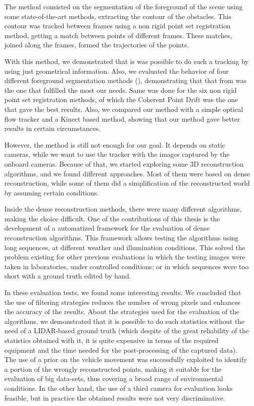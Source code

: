 The method consisted on the segmentation of the foreground of the scene using some state-of-the-art methods, extracting the contour of the obstacles. This contour was tracked between frames using a non rigid point set registration method, getting a match between points of different frames. These matches, joined along the frames, formed the trajectories of the points.

With this method, we demonstrated that is was possible to do such a tracking by using just geometrical information. Also, we evaluated the behavior of four different foreground segmentation methods (\cite{lopez2011stochastic, lopez2011foreground, guo2011hierarchical, reddy2012improved}), demonstrating that that from \cite{reddy2012improved} was the one that fulfilled the most our needs. Same was done for the six non rigid point set registration methods, of which the Coherent Point Drift was the one that gave the best results. Also, we compared our method with a simple optical flow tracker and a Kinect based method, showing that our method gave better results in certain circumstances.

However, the method is still not enough for our goal. It depends on static cameras, while we want to use the tracker with the images captured by the onboard cameras. Because of that, we started exploring some 3D reconstruction algorithms, and we found different approaches. Most of them were based on dense reconstruction, while some of them did a simplification of the reconstructed world by assuming certain conditions.

Inside the dense reconstruction methods, there were many different algorithms, making the choice difficult. One of the contributions of this thesis is the development of a automatized framework for the evaluation of dense reconstruction algorithms. This framework allows testing the algorithms using long sequences, at different weather and illumination conditions. This solved the problem existing for other previous evaluations in which the testing images were taken in laboratories, under controlled conditions; or in which sequences were too short with a ground truth edited by hand.

In these evaluation tests, we found some interesting results. We concluded that the use of filtering strategies reduces the number of wrong pixels and enhances the accuracy of the results. About the strategies used for the evaluation of the algorithms, we demonstrated that it is possible to do such statistics without the need of a \ac{LIDAR}-based ground truth (which despite of the great reliability of the statistics obtained with it, it is quite expensive in terms of the required equipment and the time needed for the post-processing of the captured data). The use of a prior on the vehicle movement was successfully exploited to identify a portion of the wrongly reconstructed points, making it suitable for the evaluation of big data-sets, thus covering a broad range of environmental conditions. In the other hand, the use of a third camera for evaluation looks feasible, but in practice the obtained results were not very discriminative.


